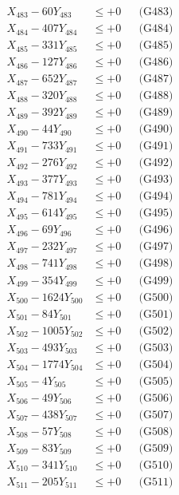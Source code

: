 \documentclass[a4paper,10pt]{article}
\begin{document}
{\begin{align}
X_{483} - 60Y_{483} &\leq +0 && \text{(G483)} \\
X_{484} - 407Y_{484} &\leq +0 && \text{(G484)} \\
X_{485} - 331Y_{485} &\leq +0 && \text{(G485)} \\
X_{486} - 127Y_{486} &\leq +0 && \text{(G486)} \\
X_{487} - 652Y_{487} &\leq +0 && \text{(G487)} \\
X_{488} - 320Y_{488} &\leq +0 && \text{(G488)} \\
X_{489} - 392Y_{489} &\leq +0 && \text{(G489)} \\
X_{490} - 44Y_{490} &\leq +0 && \text{(G490)} \\
\allowbreak
X_{491} - 733Y_{491} &\leq +0 && \text{(G491)} \\
X_{492} - 276Y_{492} &\leq +0 && \text{(G492)} \\
X_{493} - 377Y_{493} &\leq +0 && \text{(G493)} \\
X_{494} - 781Y_{494} &\leq +0 && \text{(G494)} \\
X_{495} - 614Y_{495} &\leq +0 && \text{(G495)} \\
X_{496} - 69Y_{496} &\leq +0 && \text{(G496)} \\
X_{497} - 232Y_{497} &\leq +0 && \text{(G497)} \\
X_{498} - 741Y_{498} &\leq +0 && \text{(G498)} \\
X_{499} - 354Y_{499} &\leq +0 && \text{(G499)} \\
X_{500} - 1624Y_{500} &\leq +0 && \text{(G500)} \\
\allowbreak
X_{501} - 84Y_{501} &\leq +0 && \text{(G501)} \\
X_{502} - 1005Y_{502} &\leq +0 && \text{(G502)} \\
X_{503} - 493Y_{503} &\leq +0 && \text{(G503)} \\
X_{504} - 1774Y_{504} &\leq +0 && \text{(G504)} \\
X_{505} - 4Y_{505} &\leq +0 && \text{(G505)} \\
X_{506} - 49Y_{506} &\leq +0 && \text{(G506)} \\
X_{507} - 438Y_{507} &\leq +0 && \text{(G507)} \\
X_{508} - 57Y_{508} &\leq +0 && \text{(G508)} \\
X_{509} - 83Y_{509} &\leq +0 && \text{(G509)} \\
X_{510} - 341Y_{510} &\leq +0 && \text{(G510)} \\
\allowbreak
X_{511} - 205Y_{511} &\leq +0 && \text{(G511)} \\

\end{align}}
\end{document}
